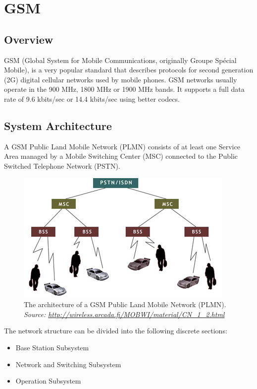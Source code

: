\chapter{GSM}

\section{Overview}

GSM (Global System for Mobile Communications, originally Groupe Sp\'ecial Mobile), is a very popular standard that describes protocols for second generation (2G) digital cellular networks used by mobile phones. GSM networks usually operate in the 900 MHz, 1800 MHz or 1900 MHz bands. It supports a full data rate of 9.6 kbits/sec or 14.4 kbits/sec using better codecs.


\section{System Architecture}

A GSM Public Land Mobile Network (PLMN) consists of at least one Service Area managed by a Mobile Switching Center (MSC) connected to the Public Switched Telephone Network  (PSTN).

\begin{figure}
\centering
\includegraphics[scale=0.7]{archPLMN}
\caption[GSM PLMN architecture]{The architecture of a GSM Public Land Mobile Network (PLMN).
\emph{Source: \url{http://wireless.arcada.fi/MOBWI/material/CN\_1\_2.html}}}
\end{figure}

The network structure can be divided into the following discrete sections:
\begin{itemize}
\item Base Station Subsystem
\item Network and Switching Subsystem
\item Operation Subsystem
\end{itemize}


